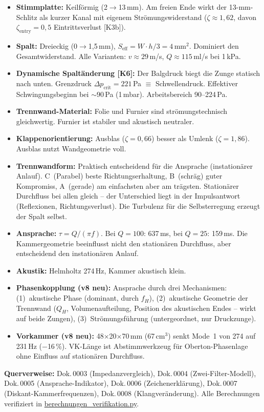 \documentclass[11pt,a4paper]{article}
\begin{document}
\begin{itemize}[leftmargin=5mm, itemsep=3pt]
\item \textbf{Stimmplatte:} Keilförmig (2$\rightarrow$13\,mm). Am freien Ende wirkt der 13-mm-Schlitz als kurzer Kanal mit eigenem Strömungswiderstand ($\zeta \approx 1{,}62$, davon $\zeta_\text{entry} = 0{,}5$ Eintrittsverlust [K3b]).

\item \textbf{Spalt:} Dreieckig (0$\rightarrow$1{,}5\,mm), $S_\text{eff} = W \cdot h/3 = 4$\,mm$^2$. Dominiert den Gesamtwiderstand. Alle Varianten: $v \approx 29$\,m/s, $Q \approx 115$\,ml/s bei 1\,kPa.

\item \textbf{Dynamische Spaltänderung [K6]:} Der Balgdruck biegt die Zunge statisch nach unten. Grenzdruck $\Delta p_\text{crit} = 221$\,Pa $\equiv$ Schwellendruck. Effektiver Schwingungsbeginn bei $\sim 90$\,Pa (1\,mbar). Arbeitsbereich 90--224\,Pa.

\item \textbf{Trennwand-Material:} Folie und Furnier sind strömungstechnisch gleichwertig. Furnier ist stabiler und akustisch neutraler.

\item \textbf{Klappenorientierung:} Ausblas ($\zeta = 0{,}66$) besser als Umlenk ($\zeta = 1{,}86$). Ausblas nutzt Wandgeometrie voll.

\item \textbf{Trennwandform:} Praktisch entscheidend für die Ansprache (instationärer Anlauf). C~(Parabel) beste Richtungserhaltung, B~(schräg) guter Kompromiss, A~(gerade) am einfachsten aber am trägsten. Stationärer Durchfluss bei allen gleich -- der Unterschied liegt in der Impulsantwort (Reflexionen, Richtungsverlust). Die Turbulenz für die Selbsterregung erzeugt der Spalt selbst.

\item \textbf{Ansprache:} $\tau = Q/(\pi f)$. Bei $Q = 100$: 637\,ms, bei $Q = 25$: 159\,ms. Die Kammergeometrie beeinflusst nicht den stationären Durchfluss, aber entscheidend den instationären Anlauf.

\item \textbf{Akustik:} Helmholtz 274\,Hz, Kammer akustisch klein.
\item \textbf{Phasenkopplung (v8 neu):} Ansprache durch drei Mechanismen: (1)~akustische Phase (dominant, durch $f_H$), (2)~akustische Geometrie der Trennwand ($Q_H$, Volumenaufteilung, Position des akustischen Endes -- wirkt auf beide Zungen), (3)~Strömungsführung (untergeordnet, nur Druckzunge).
\item \textbf{Vorkammer (v8 neu):} 48$\times$20$\times$70\,mm (67\,cm$^3$) senkt Mode~1 von 274 auf 231\,Hz ($-$16\,\%). VK-Länge ist Abstimmwerkzeug für Oberton-Phasenlage ohne Einfluss auf stationären Durchfluss.
\end{itemize}

\vspace{4mm}
{\small\textbf{Querverweise:} Dok.\,0003 (Impedanzvergleich), Dok.\,0004 (Zwei-Filter-Modell), Dok.\,0005 (Ansprache-Indikator), Dok.\,0006 (Zeichenerklärung), Dok.\,0007 (Diskant-Kammerfrequenzen), Dok.\,0008 (Klangveränderung). Alle Berechnungen verifiziert in \href{berechnungen_verifikation.py}{berechnungen\_verifikation.py}.}
\end{document}
